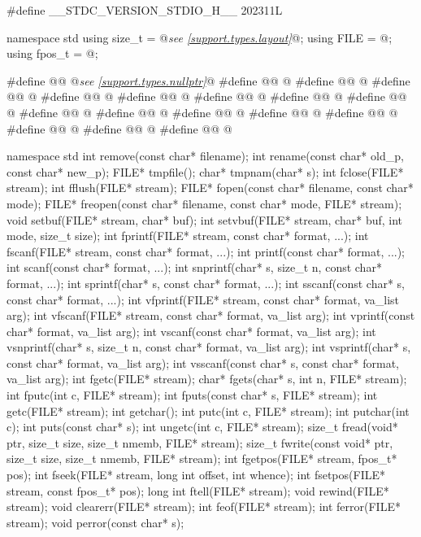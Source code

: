 \begin{codeblock}
#define __STDC_VERSION_STDIO_H__ 202311L

namespace std {
  using size_t = @\textit{see \ref{support.types.layout}}@;
  using FILE = @\seebelow@;
  using fpos_t = @\seebelow@;
}

#define @@ @\textit{see \ref{support.types.nullptr}}@
#define @@ @\seebelow@
#define @@ @\seebelow@
#define @@ @\seebelow@
#define @@ @\seebelow@
#define @@ @\seebelow@
#define @@ @\seebelow@
#define @@ @\seebelow@
#define @@ @\seebelow@
#define @@ @\seebelow@
#define @@ @\seebelow@
#define @@ @\seebelow@
#define @@ @\seebelow@
#define @@ @\seebelow@
#define @@ @\seebelow@
#define @@ @\seebelow@
#define @@ @\seebelow@

namespace std {
  int remove(const char* filename);
  int rename(const char* old_p, const char* new_p);
  FILE* tmpfile();
  char* tmpnam(char* s);
  int fclose(FILE* stream);
  int fflush(FILE* stream);
  FILE* fopen(const char* filename, const char* mode);
  FILE* freopen(const char* filename, const char* mode, FILE* stream);
  void setbuf(FILE* stream, char* buf);
  int setvbuf(FILE* stream, char* buf, int mode, size_t size);
  int fprintf(FILE* stream, const char* format, ...);
  int fscanf(FILE* stream, const char* format, ...);
  int printf(const char* format, ...);
  int scanf(const char* format, ...);
  int snprintf(char* s, size_t n, const char* format, ...);
  int sprintf(char* s, const char* format, ...);
  int sscanf(const char* s, const char* format, ...);
  int vfprintf(FILE* stream, const char* format, va_list arg);
  int vfscanf(FILE* stream, const char* format, va_list arg);
  int vprintf(const char* format, va_list arg);
  int vscanf(const char* format, va_list arg);
  int vsnprintf(char* s, size_t n, const char* format, va_list arg);
  int vsprintf(char* s, const char* format, va_list arg);
  int vsscanf(const char* s, const char* format, va_list arg);
  int fgetc(FILE* stream);
  char* fgets(char* s, int n, FILE* stream);
  int fputc(int c, FILE* stream);
  int fputs(const char* s, FILE* stream);
  int getc(FILE* stream);
  int getchar();
  int putc(int c, FILE* stream);
  int putchar(int c);
  int puts(const char* s);
  int ungetc(int c, FILE* stream);
  size_t fread(void* ptr, size_t size, size_t nmemb, FILE* stream);
  size_t fwrite(const void* ptr, size_t size, size_t nmemb, FILE* stream);
  int fgetpos(FILE* stream, fpos_t* pos);
  int fseek(FILE* stream, long int offset, int whence);
  int fsetpos(FILE* stream, const fpos_t* pos);
  long int ftell(FILE* stream);
  void rewind(FILE* stream);
  void clearerr(FILE* stream);
  int feof(FILE* stream);
  int ferror(FILE* stream);
  void perror(const char* s);
}
\end{codeblock}

